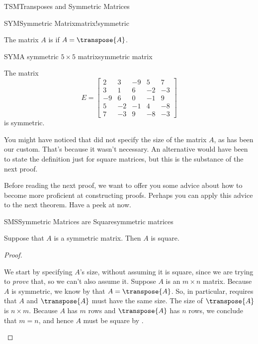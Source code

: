 \begin{subsect}{TSM}{Transposes and Symmetric Matrices}
%
\begin{definition}{SYM}{Symmetric Matrix}{matrix!symmetric}
\begin{para}The matrix $A$ is  if $A=\transpose{A}$.\end{para}
\end{definition}
%
\begin{example}{SYM}{A symmetric $5\times 5$ matrix}{symmetric matrix}
\begin{para}The matrix
%
\begin{equation*}
E=
\begin{bmatrix}
2&3&-9&5&7\\
3&1&6&-2&-3\\
-9&6&0&-1&9\\
5&-2&-1&4&-8\\
7&-3&9&-8&-3
\end{bmatrix}
\end{equation*}
%
is symmetric.\end{para}
\end{example}
%
\begin{para}You might have noticed that  did not specify the size of the matrix $A$, as has been our custom.  That's because it wasn't necessary.  An alternative would have been to state the definition just for square matrices, but this is the substance of the next proof.\end{para}
%
\begin{para}Before reading the next proof, we want to offer you some advice about how to become more proficient at constructing proofs.  Perhaps you can apply this advice to the next theorem.  Have a peek at  now.\end{para}
%
\begin{theorem}{SMS}{Symmetric Matrices are Square}{symmetric matrices}
\begin{para}Suppose that $A$ is a symmetric matrix.  Then $A$ is square.\end{para}
\end{theorem}
%
\begin{proof}
\begin{para}We start by specifying $A$'s size, without assuming it is square, since we are trying to {\em prove} that, so we can't also assume it.  Suppose $A$ is an $m\times n$ matrix.  Because $A$ is symmetric, we know by  that $A=\transpose{A}$.  So, in particular,  requires that $A$ and $\transpose{A}$ must have the same size.  The size of $\transpose{A}$ is $n\times m$.  Because $A$ has $m$ rows and $\transpose{A}$ has $n$ rows, we conclude that $m=n$, and hence $A$ must be square by .\end{para}

\end{proof}
\end{subsect}
